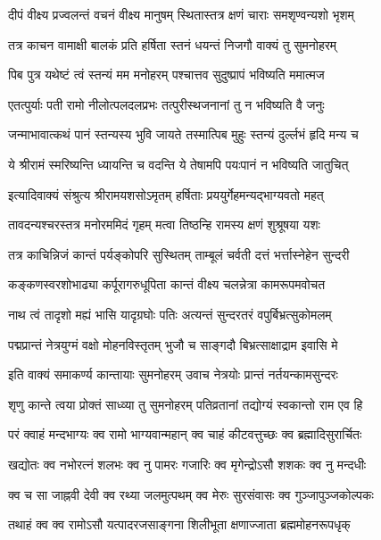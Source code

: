 \twolineshloka
{दीपं वीक्ष्य प्रज्वलन्तं वचनं वीक्ष्य मानुषम्}
{स्थितास्तत्र क्षणं चाराः समशृण्वन्यशो भृशम्}%

\twolineshloka
{तत्र काचन वामाक्षी बालकं प्रति हर्षिता}
{स्तनं धयन्तं निजगौ वाक्यं तु सुमनोहरम्}%

\twolineshloka
{पिब पुत्र यथेष्टं त्वं स्तन्यं मम मनोहरम्}
{पश्चात्तव सुदुष्प्रापं भविष्यति ममात्मज}%

\twolineshloka
{एतत्पुर्याः पती रामो नीलोत्पलदलप्रभः}
{तत्पुरीस्थजनानां तु न भविष्यति वै जनुः}%

\twolineshloka
{जन्माभावात्कथं पानं स्तन्यस्य भुवि जायते}
{तस्मात्पिब मुहुः स्तन्यं दुर्ल्लभं हृदि मन्य च}%

\twolineshloka
{ये श्रीरामं स्मरिष्यन्ति ध्यायन्ति च वदन्ति ये}
{तेषामपि पयःपानं न भविष्यति जातुचित्}%

\twolineshloka
{इत्यादिवाक्यं संश्रुत्य श्रीरामयशसोऽमृतम्}
{हर्षिताः प्रययुर्गेहमन्यद्भाग्यवतो महत्}%

\twolineshloka
{तावदन्यश्चरस्तत्र मनोरममिदं गृहम्}
{मत्वा तिष्ठन्हि रामस्य क्षणं शुश्रूषया यशः}%

\twolineshloka
{तत्र काचिन्निजं कान्तं पर्यङ्कोपरि सुस्थितम्}
{ताम्बूलं चर्वती दत्तं भर्त्तास्नेहेन सुन्दरी}%

\twolineshloka
{कङ्कणस्वरशोभाढ्या कर्पूरागरुधूपिता}
{कान्तं वीक्ष्य चलन्नेत्रा कामरूपमवोचत}%

\twolineshloka
{नाथ त्वं तादृशो मह्यं भासि यादृग्रघोः पतिः}
{अत्यन्तं सुन्दरतरं वपुर्बिभ्रत्सुकोमलम्}%

\twolineshloka
{पद्मप्रान्तं नेत्रयुग्मं वक्षो मोहनविस्तृतम्}
{भुजौ च साङ्गदौ बिभ्रत्साक्षाद्राम इवासि मे}%

\twolineshloka
{इति वाक्यं समाकर्ण्य कान्तायाः सुमनोहरम्}
{उवाच नेत्रयोः प्रान्तं नर्तयन्कामसुन्दरः}%

\twolineshloka
{शृणु कान्ते त्वया प्रोक्तं साध्व्या तु सुमनोहरम्}
{पतिव्रतानां तद्योग्यं स्वकान्तो राम एव हि}%

\twolineshloka
{परं क्वाहं मन्दभाग्यः क्व रामो भाग्यवान्महान्}
{क्व चाहं कीटवत्तुच्छः क्व ब्रह्मादिसुरार्चितः}%

\twolineshloka
{खद्योतः क्व नभोरत्नं शलभः क्व नु पामरः}
{गजारिः क्व मृगेन्द्रोऽसौ शशकः क्व नु मन्दधीः}%

\twolineshloka
{क्व च सा जाह्नवी देवी क्व रथ्या जलमुत्पथम्}
{क्व मेरुः सुरसंवासः क्व गुञ्जापुञ्जकोल्पकः}%

\twolineshloka
{तथाहं क्व क्व रामोऽसौ यत्पादरजसाङ्गना}
{शिलीभूता क्षणाज्जाता ब्रह्ममोहनरूपधृक्}%

